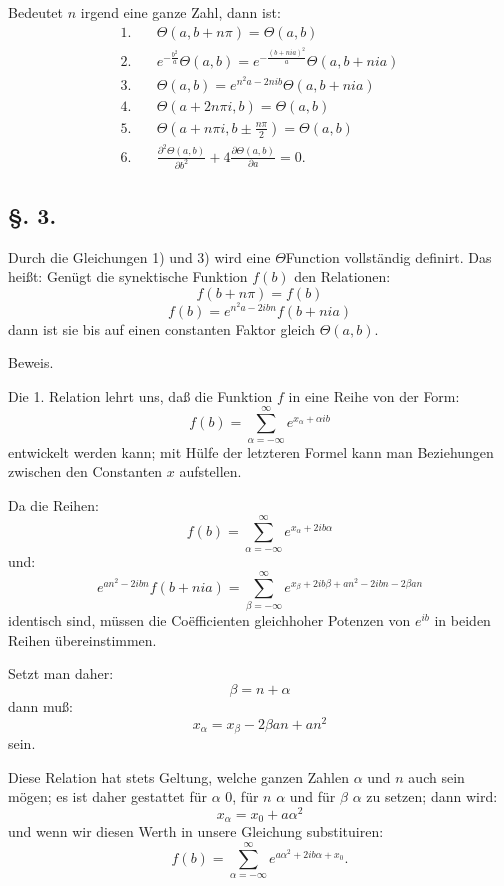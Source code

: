 \documentclass[10pt]{article}
\newcommand{\dd}{\partial}
\newcommand{\sourceanchor}[1]{\hypertarget{source-#1}{}}
\begin{document}
Bedeutet \(n\) irgend eine ganze Zahl, dann ist:
\begin{align*}
1.\quad& \Theta(a,b+n\pi)=\Theta(a,b)\\
2.\quad& e^{-\frac{b^{2}}{a}}\Theta(a,b)=e^{-\frac{(b+nia)^{2}}{a}}\Theta(a,b+nia)\\
3.\quad& \Theta(a,b)=e^{n^{2}a-2nib}\Theta(a,b+nia)\\
4.\quad& \Theta(a+2n\pi i,b)=\Theta(a,b)\\
5.\quad& \Theta\!\left(a+n\pi i,b\pm \frac{n\pi}{2}\right)=\Theta(a,b)\\
6.\quad& \frac{\dd^{2}\Theta(a,b)}{\dd b^{2}}+4\frac{\dd\Theta(a,b)}{\dd a}=0.
\end{align*}

\subsection*{\S. 3.}
Durch die Gleichungen 1) und 3) wird eine \(\Theta\)Function vollständig definirt. Das heißt: Genügt die synektische Funktion \(f(b)\) den Relationen:
\[
f(b+n\pi)=f(b)
\]
\[
f(b)=e^{n^{2}a-2ibn}f(b+nia)
\]
dann ist sie bis auf einen constanten Faktor gleich \(\Theta(a,b)\).

\sourceanchor{PA04}
\begin{center}Beweis.\end{center}
Die 1. Relation lehrt uns, daß die Funktion \(f\) in eine Reihe von der Form:
\[
f(b)=\sum_{\alpha=-\infty}^{\infty} e^{x_{\alpha}+\alpha ib}
\]
entwickelt werden kann; mit Hülfe der letzteren Formel kann man Beziehungen zwischen den Constanten \(x\) aufstellen.

Da die Reihen:
\[
f(b)=\sum_{\alpha=-\infty}^{\infty}e^{x_{\alpha}+2ib\alpha}
\]
und:
\[
e^{an^{2}-2ibn}f(b+nia)=\sum_{\beta=-\infty}^{\infty}e^{x_{\beta}+2ib\beta+an^{2}-2ibn-2\beta an}
\]
identisch sind, müssen die Coëfficienten gleichhoher Potenzen von \(e^{ib}\) in beiden Reihen übereinstimmen.

Setzt man daher:
\[
\beta=n+\alpha
\]
dann muß:
\[
x_{\alpha}=x_{\beta}-2\beta an+an^{2}
\]
sein.

Diese Relation hat stets Geltung, welche ganzen Zahlen \(\alpha\) und \(n\) auch sein mögen; es ist daher gestattet für \(\alpha\) 0, für \(n\) \(\alpha\) und für \(\beta\) \(\alpha\) zu setzen; dann wird:
\[
x_{\alpha}=x_{0}+a\alpha^{2}
\]
und wenn wir diesen Werth in unsere Gleichung substituiren:
\[
f(b)=\sum_{\alpha=-\infty}^{\infty}e^{a\alpha^{2}+2ib\alpha+x_{0}}.
\]
\end{document}
